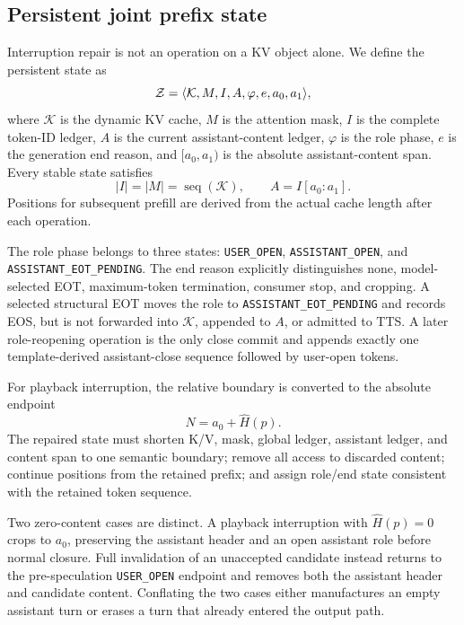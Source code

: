 \subsection{Persistent joint prefix state}

Interruption repair is not an operation on a KV object alone. We define the persistent state as
\begin{equation}
\mathcal{Z}=\langle\mathcal{K},M,I,A,\varphi,e,a_0,a_1\rangle,
\label{eq:joint-state}
\end{equation}
where $\mathcal{K}$ is the dynamic KV cache, $M$ is the attention mask, $I$ is the complete token-ID ledger, $A$ is the current assistant-content ledger, $\varphi$ is the role phase, $e$ is the generation end reason, and $[a_0,a_1)$ is the absolute assistant-content span. Every stable state satisfies
\begin{equation}
|I|=|M|=\operatorname{seq}(\mathcal{K}),\qquad A=I[a_0:a_1].
\label{eq:invariants}
\end{equation}
Positions for subsequent prefill are derived from the actual cache length after each operation.

The role phase belongs to three states: \texttt{USER\_OPEN}, \texttt{ASSISTANT\_OPEN}, and \texttt{ASSISTANT\_EOT\_PENDING}. The end reason explicitly distinguishes none, model-selected EOT, maximum-token termination, consumer stop, and cropping. A selected structural EOT moves the role to \texttt{ASSISTANT\_EOT\_PENDING} and records EOS, but is not forwarded into $\mathcal{K}$, appended to $A$, or admitted to TTS. A later role-reopening operation is the only close commit and appends exactly one template-derived assistant-close sequence followed by user-open tokens.

For playback interruption, the relative boundary is converted to the absolute endpoint
\begin{equation}
N=a_0+\widehat H(p).
\label{eq:absolute-crop}
\end{equation}
The repaired state must shorten K/V, mask, global ledger, assistant ledger, and content span to one semantic boundary; remove all access to discarded content; continue positions from the retained prefix; and assign role/end state consistent with the retained token sequence.

Two zero-content cases are distinct. A playback interruption with $\widehat H(p)=0$ crops to $a_0$, preserving the assistant header and an open assistant role before normal closure. Full invalidation of an unaccepted candidate instead returns to the pre-speculation \texttt{USER\_OPEN} endpoint and removes both the assistant header and candidate content. Conflating the two cases either manufactures an empty assistant turn or erases a turn that already entered the output path.
